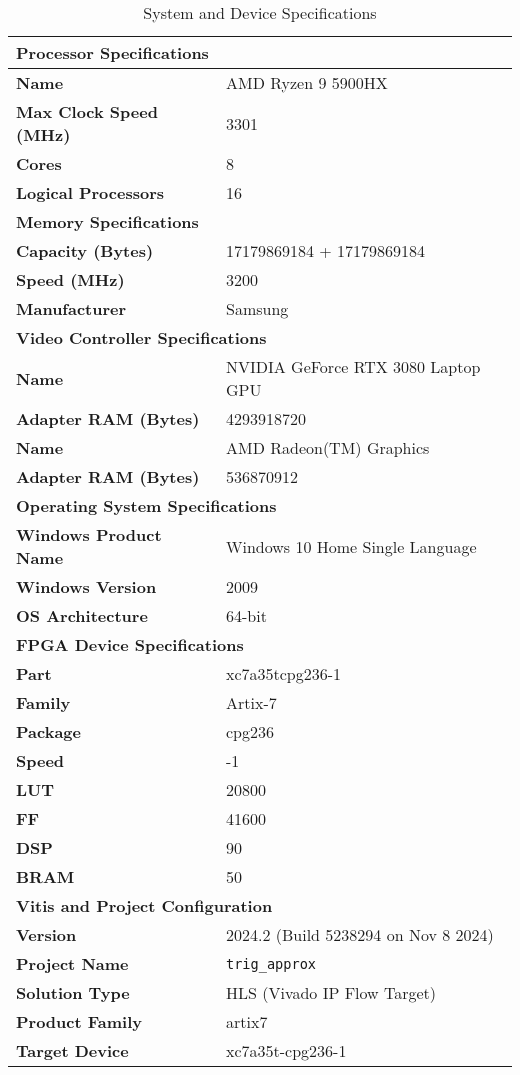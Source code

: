 \documentclass[12pt,twoside, letterpaper, margin=1in]{article}
\begin{document}
\begin{table}[H]
  \centering
  \caption{System and Device Specifications}
  \small
  \begin{tabular}{ll}
    \toprule
    \multicolumn{2}{l}{\textbf{Processor Specifications}} \\
    \midrule
    \textbf{Name} & AMD Ryzen 9 5900HX \\
    \textbf{Max Clock Speed (MHz)} & 3301 \\
    \textbf{Cores} & 8 \\
    \textbf{Logical Processors} & 16 \\
    \midrule
    \multicolumn{2}{l}{\textbf{Memory Specifications}} \\
    \midrule
    \textbf{Capacity (Bytes)} & 17179869184 + 17179869184 \\
    \textbf{Speed (MHz)} & 3200 \\
    \textbf{Manufacturer} & Samsung \\
    \midrule
    \multicolumn{2}{l}{\textbf{Video Controller Specifications}} \\
    \midrule
    \textbf{Name} & NVIDIA GeForce RTX 3080 Laptop GPU \\
    \textbf{Adapter RAM (Bytes)} & 4293918720 \\
    \textbf{Name} & AMD Radeon(TM) Graphics \\
    \textbf{Adapter RAM (Bytes)} & 536870912 \\
    \midrule
    \multicolumn{2}{l}{\textbf{Operating System Specifications}} \\
    \midrule
    \textbf{Windows Product Name} & Windows 10 Home Single Language \\
    \textbf{Windows Version} & 2009 \\
    \textbf{OS Architecture} & 64-bit \\
    \midrule
    \multicolumn{2}{l}{\textbf{FPGA Device Specifications}} \\
    \midrule
    \textbf{Part} & xc7a35tcpg236-1 \\
    \textbf{Family} & Artix-7 \\
    \textbf{Package} & cpg236 \\
    \textbf{Speed} & -1 \\
    \textbf{LUT} & 20800 \\
    \textbf{FF} & 41600 \\
    \textbf{DSP} & 90 \\
    \textbf{BRAM} & 50 \\
    \midrule
    \multicolumn{2}{l}{\textbf{Vitis and Project Configuration}} \\
    \midrule
    \textbf{Version} & 2024.2 (Build 5238294 on Nov 8 2024) \\
    \textbf{Project Name} & \texttt{trig\_approx} \\
    \textbf{Solution Type} & HLS (Vivado IP Flow Target) \\
    \textbf{Product Family} & artix7 \\
    \textbf{Target Device} & xc7a35t-cpg236-1 \\
    \bottomrule
  \end{tabular}
  \label{tab:hardware-specs}
\end{table}
\end{document}

